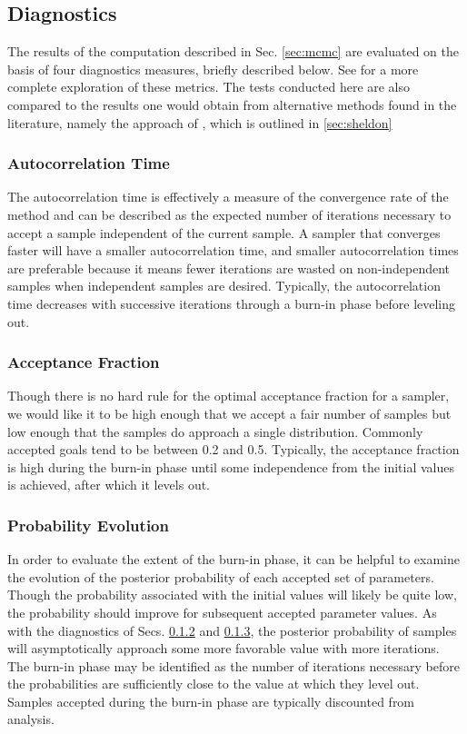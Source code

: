 \documentclass[preprint]{aastex}
\begin{document}
\subsection{Diagnostics}
\label{sec:diag}

The results of the computation described in Sec. \ref{sec:mcmc} are evaluated on the basis of four diagnostics measures, briefly described below.  See \citet{for12} for a more complete exploration of these metrics.  The tests conducted here are also compared to the results one would obtain from alternative methods found in the literature, namely the approach of \citet{she11}, which is outlined in \ref{sec:sheldon}

\subsubsection{Autocorrelation Time}
\label{sec:acorr}

The autocorrelation time is effectively a measure of the convergence rate of the method and can be described as the expected number of iterations necessary to accept a sample independent of the current sample.  A sampler that converges faster will have a smaller autocorrelation time, and smaller autocorrelation times are preferable because it means fewer iterations are wasted on non-independent samples when independent samples are desired.  Typically, the autocorrelation time decreases with successive iterations through a burn-in phase before leveling out.

\subsubsection{Acceptance Fraction}
\label{sec:afrac}

Though there is no hard rule for the optimal acceptance fraction for a sampler, we would like it to be high enough that we accept a fair number of samples but low enough that the samples do approach a single distribution.  Commonly accepted goals tend to be between 0.2 and 0.5.  Typically, the acceptance fraction is high during the burn-in phase until some independence from the initial values is achieved, after which it levels out.

\subsubsection{Probability Evolution}
\label{sec:probs}

In order to evaluate the extent of the burn-in phase, it can be helpful to examine the evolution of the posterior probability of each accepted set of parameters.  Though the probability associated with the initial values will likely be quite low, the probability should improve for subsequent accepted parameter values.  As with the diagnostics of Secs. \ref{sec:afrac} and \ref{sec:probs}, the posterior probability of samples will asymptotically approach some more favorable value with more iterations.  The burn-in phase may be identified as the number of iterations necessary before the probabilities are sufficiently close to the value at which they level out.  Samples accepted during the burn-in phase are typically discounted from analysis.
\end{document}
